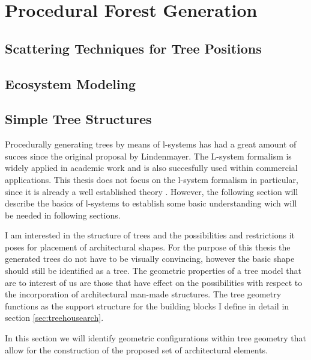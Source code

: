 

\chapter{Procedural Forest Generation}
\label{sec:pfg}



\section{Scattering Techniques for Tree Positions}
\label{subsec:scattering}


\citet{mickwestgamasutra}
%


\section{Ecosystem Modeling}


\section{Simple Tree Structures}

Procedurally generating trees by means of l-systems has had a great amount of succes since the original proposal by Lindenmayer. The L-system formalism is widely applied in  academic work and is also succesfully used within commercial applications. This thesis does not focus on the l-system formalism in particular, since it is already a well established theory \citet{PrzemyslawAlgoBeauty}. However, the following section will describe the basics of l-systems to establish some basic understanding wich will be needed in following sections. 


I am interested in the structure of trees and the possibilities and restrictions it poses for placement of 
architectural shapes. For the purpose of this thesis the generated trees do not have to be visually convincing, 
however the basic shape should still be identified as a tree. The geometric properties of a tree model that are to interest of us are those that have effect on the possibilities with respect to the incorporation of architectural man-made structures. The tree geometry functions as the support structure for the building blocks I define in detail in section \ref{sec:treehousearch}. 

In this section we will identify geometric configurations within tree geometry that allow for the construction of the proposed set of architectural elements.    

%   
%
%

